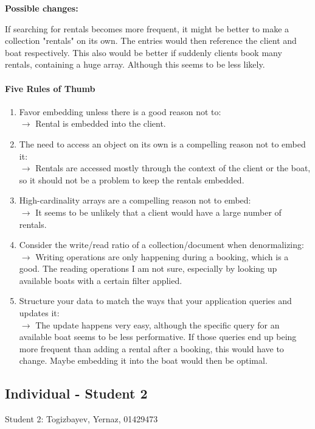 \documentclass[a4paper, 11pt]{article}          %
\newcommand{\studenttwo}{Student 2: Togizbayev, Yernaz, 01429473}
\begin{document}
\noindent
\textbf{Possible changes:}

\noindent
If searching for rentals becomes more frequent, it might be better to make a collection "rentals" on its own. The entries would then reference the client and boat respectively. This also would be better if suddenly clients book many rentals, containing a huge array. Although this seems to be less likely.

\paragraph*{Five Rules of Thumb}
\begin{enumerate}
    \item Favor embedding unless there is a good reason not to:\\
    $\to$ Rental is embedded into the client.
    \item The need to access an object on its own is a compelling reason not to embed it:\\
    $\to$ Rentals are accessed mostly through the context of the client or the boat, so it should not be a problem to keep the rentals embedded.
    \item High-cardinality arrays are a compelling reason not to embed:\\
    $\to$ It seems to be unlikely that a client would have a large number of rentals.
    \item Consider the write/read ratio of a collection/document when denormalizing:\\
    $\to$ Writing operations are only happening during a booking, which is a good. The reading operations I am not sure, especially by looking up available boats with a certain filter applied.
    \item Structure your data to match the ways that your application queries and updates it:\\
    $\to$ The update happens very easy, although the specific query for an available boat seems to be less performative. If those queries end up being more frequent than adding a rental after a booking, this would have to change. Maybe embedding it into the boat would then be optimal.
\end{enumerate}

\newpage

\subsection{Individual - Student 2}
\studenttwo
\end{document}
